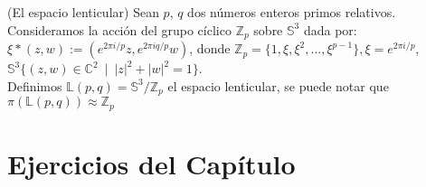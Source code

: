 \begin{example}(El espacio lenticular)
Sean $p$, $q$ dos n\'umeros enteros primos relativos. Consideramos la acci\'on del grupo c\'iclico $\mathbb Z_p$ sobre $\mathbb S^3$ dada por:\\

$\xi*(z,w):=(e^{2 \pi i/p}z,e^{2 \pi iq/p}w)$, donde $\mathbb Z_p=\lbrace 1,\xi,\xi^2,...,\xi^{p-1} \rbrace, \xi = e^{2 \pi i/p}$, $\mathbb S^3 \lbrace (z,w) \in \mathbb C^2 \: \mid \: |z|^2  + |w|^2=1 \rbrace$.\\

Definimos $\mathbb{L}(p,q)= \mathbb S^3/\mathbb Z_p$ el espacio lenticular, se puede notar que $\pi(\mathbb{L}(p,q))\approx \mathbb Z_p$
\end{example}

\section{Ejercicios del Cap\'itulo}

